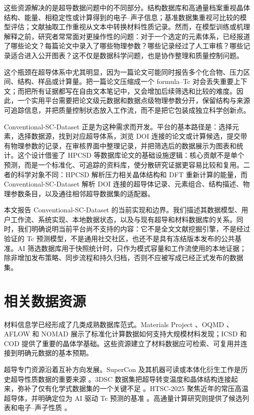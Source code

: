 \documentclass[11pt,a4paper]{ctexart}
\begin{document}
这些资源解决的是超导数据问题中的不同部分。结构数据库和高通量档案重视晶体结构、能量、相稳定性或计算得到的电子--声子信息；基准数据集重视可比较的模型评估；文献抽取工作重视从文本中转换材料性质记录。然而，在模型训练或机理解释之前，研究者常常面对更操作性的问题：对于一个选定的元素体系，已经报道了哪些论文？每篇论文中录入了哪些物理参数？哪些记录经过了人工审核？哪些记录适合进入公开图表？这不仅是数据科学问题，也是协作整理和质量控制问题。

这个瓶颈在超导体系中尤其明显，因为一篇论文可能同时报告多个化合物、压力区间、结构、样品或计算量。把一篇论文压缩成一个 formula--Tc 对会丢失重要上下文；而把所有证据都写在自由文本笔记中，又会增加后续筛选和比较的难度。因此，一个实用平台需要把论文级元数据和数据点级物理参数分开，保留结构与来源可追踪信息，并把质量控制状态放入工作流，而不是把它包装成独立科学创新点。

Conventional-SC-Dataset 正是为这种需求而开发。平台的基本路径是：选择元素，选择数据源，找到对应超导体系，浏览 DOI 连接的论文或计算候选，提交带有物理参数的记录，在审核界面中整理记录，并把筛选后的数据展示为图表和统计。这个设计借鉴了 HPCSD 等数据库论文的基础设施逻辑：核心贡献不是单个预测，而是一个标准化、可追踪的资料库，使分散研究证据更容易比较和复用。二者的科学对象不同：HPCSD 解析压力相关晶体结构和 DFT 重新计算的能量，而 Conventional-SC-Dataset 解析 DOI 连接的超导体记录、元素组合、结构描述、物理参数条目，以及通往相邻超导数据集的适配器。

本文报告 Conventional-SC-Dataset 的当前实现和边界。我们描述其数据模型、用户工作流、系统实现、本地数据状态，以及与现有超导和材料数据库的关系。同时，我们明确说明当前平台尚不支持的内容：它不是全文文献挖掘引擎，不是经过验证的 Tc 预测模型，不是通用社交社区，也还不是具有冻结版本发布的公共基准。AI 筛选数据库用于快照统计时，只作为模式容量和工作流使用的本地证据；除非增加发布策略、同步流程和持久归档，否则不应被写成已经正式发布的数据集。

\section{相关数据资源}

材料信息学已经形成了几类成熟数据库范式。Materials Project \cite{jain2013materialsproject}、OQMD \cite{kirklin2015oqmd}、AFLOW \cite{curtarolo2015aflow} 和 NOMAD \cite{draxl2018nomad} 展示了标准化计算数据如何支持大规模材料发现；ICSD \cite{belsky2002icsd} 和 COD \cite{grazulis2012cod} 提供了重要的晶体学基础。这些资源建立了材料数据应可检索、可复用并连接到明确元数据的基本预期。

超导专门资源沿着互补方向发展。SuperCon 及其机器可读或本体化衍生工作是历史超导性质数据的重要来源 \cite{nimsSupercon,foppiano2023supercon2,ishii2023ontology}。3DSC 数据集把超导转变温度和晶体结构连接起来，弥补了仅有化学式数据集的一个关键不足 \cite{sommer2023threedsc}。HTSC-2025 聚焦近年的常压高温超导体，并明确定位为 AI 驱动 Tc 预测的基准 \cite{han2025htsc}。高通量计算研究则提供了候选列表和电子--声子性质 \cite{bercx2025prxenergy,pires2026ambient}。
\end{document}
